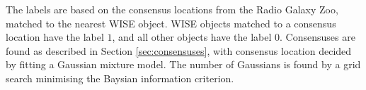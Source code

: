 \documentclass[11pt]{book}
\begin{document}
  The labels are based on the consensus locations from the Radio Galaxy Zoo, matched to the nearest WISE object. WISE objects matched to a consensus location have the label $1$, and all other objects have the label $0$. Consensuses are found as described in Section \ref{sec:consensuses}, with consensus location decided by fitting a Gaussian mixture model. The number of Gaussians is found by a grid search minimising the Baysian information criterion.






\backmatter





\printindex
\end{document}
